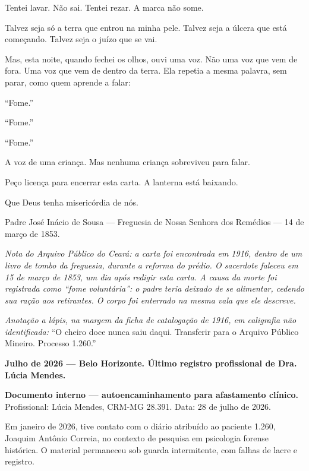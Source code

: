 \noindent Tentei lavar. Não sai. Tentei rezar. A marca não some.

\noindent Talvez seja só a terra que entrou na minha pele. Talvez seja a úlcera que está começando. Talvez seja o juízo que se vai.

\noindent Mas, esta noite, quando fechei os olhos, ouvi uma voz. Não uma voz que vem de fora. Uma voz que vem de dentro da terra. Ela repetia a mesma palavra, sem parar, como quem aprende a falar:

\noindent ``Fome.''

\noindent ``Fome.''

\noindent ``Fome.''

\noindent A voz de uma criança. Mas nenhuma criança sobreviveu para falar.

\noindent Peço licença para encerrar esta carta. A lanterna está baixando.

\noindent Que Deus tenha misericórdia de nós.

\vspace{0.5em}
\noindent Padre José Inácio de Sousa --- Freguesia de Nossa Senhora dos Remédios --- 14 de março de 1853.

\vspace{0.8em}
\noindent \textit{Nota do Arquivo Público do Ceará: a carta foi encontrada em 1916, dentro de um livro de tombo da freguesia, durante a reforma do prédio. O sacerdote faleceu em 15 de março de 1853, um dia após redigir esta carta. A causa da morte foi registrada como ``fome voluntária'': o padre teria deixado de se alimentar, cedendo sua ração aos retirantes. O corpo foi enterrado na mesma vala que ele descreve.}

\vspace{0.5em}
\noindent \textit{Anotação a lápis, na margem da ficha de catalogação de 1916, em caligrafia não identificada:} ``O cheiro doce nunca saiu daqui. Transferir para o Arquivo Público Mineiro. Processo 1.260.''

\vspace{1em}
\noindent \textbf{Julho de 2026 --- Belo Horizonte. Último registro profissional de Dra. Lúcia Mendes.}

\noindent \textbf{Documento interno --- autoencaminhamento para afastamento clínico.} Profissional: Lúcia Mendes, CRM-MG 28.391. Data: 28 de julho de 2026.

\noindent Em janeiro de 2026, tive contato com o diário atribuído ao paciente 1.260, Joaquim Antônio Correia, no contexto de pesquisa em psicologia forense histórica. O material permaneceu sob guarda intermitente, com falhas de lacre e registro.

